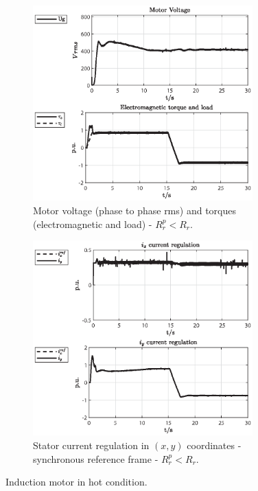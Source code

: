 \documentclass[11pt,a4paper,oneside]{book}
\numberwithin{equation}{section}
\theoremstyle{it}
\theoremstyle{definition}
\begin{document}
\begin{figure}[H]
	\centering
	\begin{subfigure}{0.5\textwidth}
	\centering
	\includegraphics[width = 240pt, keepaspectratio]{figures/sim_results/hot_condition/motor_voltage.eps}
	\captionsetup{width=0.65\textwidth, font=footnotesize}	
	\caption{Motor voltage (phase to phase rms) and torques (electromagnetic and load) - $R_r^p < R_r$.}
	\label{fig_sim_res_15}
	\end{subfigure}%
	\begin{subfigure}{0.5\textwidth}
	\centering
	\includegraphics[width = 240pt, keepaspectratio]{figures/sim_results/hot_condition/current_reg.eps}
	\captionsetup{width=0.65\textwidth, font=footnotesize}	
	\caption{Stator current regulation in $(x,y)$ coordinates - synchronous reference frame - $R_r^p < R_r$.}
	\label{fig_sim_res_16}
	\end{subfigure}		
	\captionsetup{width=0.5\textwidth, font=small}		
	\caption{Induction motor in hot condition.}
	\label{}
\end{figure}
\end{document}
